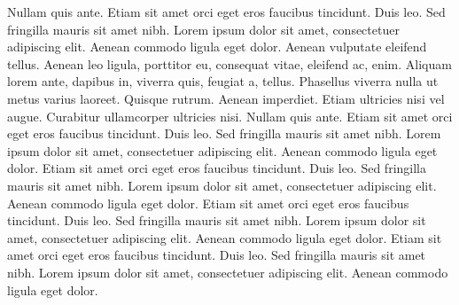 Nullam quis ante. Etiam sit amet orci eget eros faucibus tincidunt. Duis leo. Sed fringilla mauris sit amet nibh. Lorem ipsum dolor sit amet, consectetuer adipiscing elit. Aenean commodo ligula eget dolor. Aenean vulputate eleifend tellus. Aenean leo ligula, porttitor eu, consequat vitae, eleifend ac, enim. Aliquam lorem ante, dapibus in, viverra quis, feugiat a, tellus. Phasellus viverra nulla ut metus varius laoreet. Quisque rutrum. Aenean imperdiet. Etiam ultricies nisi vel augue. Curabitur ullamcorper ultricies nisi. Nullam quis ante. Etiam sit amet orci eget eros faucibus tincidunt. Duis leo. Sed fringilla mauris sit amet nibh. Lorem ipsum dolor sit amet, consectetuer adipiscing elit. Aenean commodo ligula eget dolor. Etiam sit amet orci eget eros faucibus tincidunt. Duis leo. Sed fringilla mauris sit amet nibh. Lorem ipsum dolor sit amet, consectetuer adipiscing elit. Aenean commodo ligula eget dolor. Etiam sit amet orci eget eros faucibus tincidunt. Duis leo. Sed fringilla mauris sit amet nibh. Lorem ipsum dolor sit amet, consectetuer adipiscing elit. Aenean commodo ligula eget dolor. Etiam sit amet orci eget eros faucibus tincidunt. Duis leo. Sed fringilla mauris sit amet nibh. Lorem ipsum dolor sit amet, consectetuer adipiscing elit. Aenean commodo ligula eget dolor.
